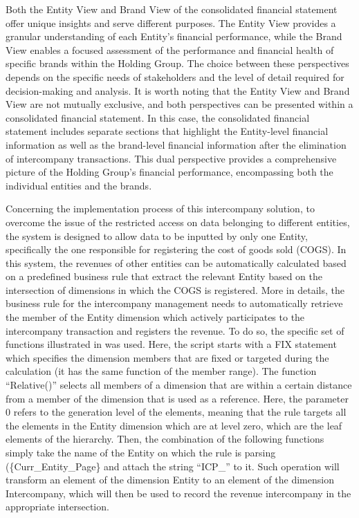 \documentclass[12pt,a4paper,openright,twoside]{book}
\begin{document}
Both the Entity View and Brand View of the consolidated financial statement offer unique insights and serve different purposes. 
%
The Entity View provides a granular understanding of each Entity's financial performance, while the Brand View enables a focused assessment of the performance and financial health of specific brands within the Holding  Group. 
%
The choice between these perspectives depends on the specific needs of stakeholders and the level of detail required for decision-making and analysis.
%
It is worth noting that the Entity View and Brand View are not mutually exclusive, and both perspectives can be presented within a consolidated financial statement. 
%
In this case, the consolidated financial statement includes separate sections that highlight the Entity-level financial information as well as the brand-level financial information after the elimination of intercompany transactions. 
%
This dual perspective provides a comprehensive picture of the Holding Group's financial performance, encompassing both the individual entities and the brands.

Concerning the implementation process of this intercompany solution, to overcome the issue of the restricted access on data belonging to different entities, the system is designed to allow data to be inputted by only one Entity, specifically the one responsible for registering the cost of goods sold (COGS).
%
In this system, the revenues of other entities can be automatically calculated based on a predefined business rule that extract the relevant Entity based on the intersection of dimensions in which the COGS is registered.
%
More in details, the business rule for the intercompany management needs to automatically retrieve the member of the Entity dimension which actively participates to the intercompany transaction and registers the revenue.
%
To do so, the specific set of functions illustrated in  was used.
%
Here, the script starts with a FIX statement which specifies the dimension members that are fixed or targeted during the calculation (it has the same function of the member range).
%
The function ``Relative()'' selects all members of a dimension that are within a certain distance from a member of the dimension that is used as a reference.
%
Here, the parameter 0 refers to the generation level of the elements, meaning that the rule targets all the elements in the Entity dimension which are at level zero, which are the leaf elements of the hierarchy.
%
Then, the combination of the following functions simply take the name of the Entity on which the rule is parsing (\{Curr\_Entity\_Page\} and attach the string ``ICP\_'' to it.
%
Such operation will transform an element of the dimension Entity to an element of the dimension Intercompany, which will then be used to record the revenue intercompany in the appropriate intersection.
\end{document}
